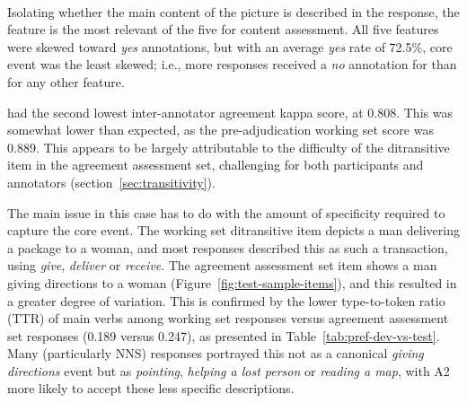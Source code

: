 \paragraph{} Isolating whether the main content of the picture is described in the response, the  feature is the most relevant of the five for content assessment. All five features were skewed toward \textit{yes} annotations, but with an average \textit{yes} rate of 72.5\%, core event was the least skewed; i.e., more responses received a \textit{no} annotation for  than for any other feature.

 had the second lowest inter-annotator agreement kappa score, at 0.808. This was somewhat lower than expected, as the pre-adjudication working set score was 0.889. This appears to be largely attributable to the difficulty of the ditransitive item in the agreement assessment set, challenging for both participants and annotators (section~\ref{sec:transitivity}). 

The main issue in this case has to do with the amount of specificity required to capture the core event.  The working set ditransitive item depicts a man delivering a package to a woman, and most responses described this as such a transaction, using \textit{give}, \textit{deliver} or \textit{receive}. The agreement assessment set item shows a man giving directions to a woman (Figure~\ref{fig:test-sample-items}), and this resulted in a greater degree of variation. This is confirmed by the lower type-to-token ratio  (TTR) of main verbs among working set responses versus agreement assessment set responses (0.189 versus 0.247), as presented in Table~\ref{tab:pref-dev-vs-test}. Many  (particularly NNS) responses portrayed this not as a canonical \textit{giving directions} event but as \textit{pointing}, 
\textit{helping a lost person} or \textit{reading a map}, with A2 more likely to accept these less specific descriptions.


